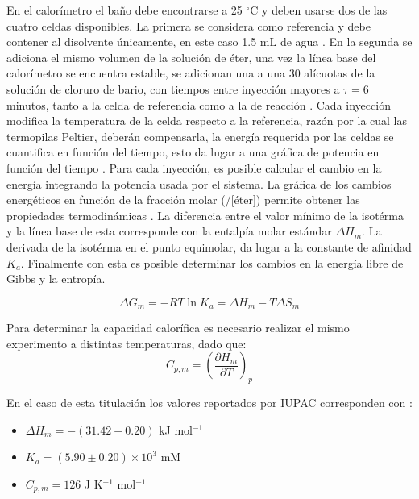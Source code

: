 	En el calorímetro el ba\~no debe encontrarse a 25 $^\circ$C y deben usarse dos de las cuatro celdas disponibles. La primera se considera como referencia y debe contener al disolvente únicamente, en este caso 1.5 mL de agua \cite{Suurkuusk}. En la segunda se adiciona el mismo volumen de la solución de éter, una vez la línea base del calorímetro se encuentra estable, se adicionan una a una 30 alícuotas de la solución de cloruro de bario, con tiempos entre inyección mayores a $\tau = 6$ minutos, tanto a la celda de referencia como a la de reacción \cite{mizoue2004calorimetric, duff2011isothermal}. Cada inyección modifica la temperatura de la celda respecto a la referencia, razón por la cual las termopilas Peltier, deberán compensarla, la energía requerida por las celdas se cuantifica en función del tiempo, esto da lugar a una gráfica de potencia en función del tiempo \cite{duff2011isothermal}. Para cada inyección, es posible calcular el cambio en la energía integrando la potencia usada por el sistema. La gráfica de los cambios energéticos en función de la fracción molar (\ce{[Ba^{2+}]}/[éter]) permite obtener  las propiedades termodinámicas \cite{duff2011isothermal, mizoue2004calorimetric}. La diferencia entre el valor mínimo de la isotérma y la línea base de esta corresponde con la entalpía molar estándar $\Delta H_m$. La derivada de la isotérma en el punto equimolar, da lugar a la constante de afinidad $K_a$. Finalmente con esta es posible determinar los cambios en la energía libre de Gibbs y la entropía.
	
	\begin{equation}
		\Delta G_m = -RT\ln K_a = \Delta H_m - T\Delta S_m
	\end{equation}
	
	Para determinar la capacidad calorífica es necesario realizar el mismo experimento a distintas temperaturas, dado que:
	\begin{equation}
		C_{p, m} = \left(\dfrac{\partial H_m}{\partial T}\right)_p
	\end{equation}
	
	En el caso de esta titulación los valores reportados por IUPAC corresponden con \cite{wadso2001standards}:
	\begin{itemize}
		\item $\Delta H_m = -(31.42 \pm 0.20)$ kJ mol$^{-1}$
		\item $K_a = (5.90 \pm 0.20)\times10^3$ mM
		\item $C_{p,m} = 126$ J K$^{-1}$ mol$^{-1}$
	\end{itemize}
	
	\newpage